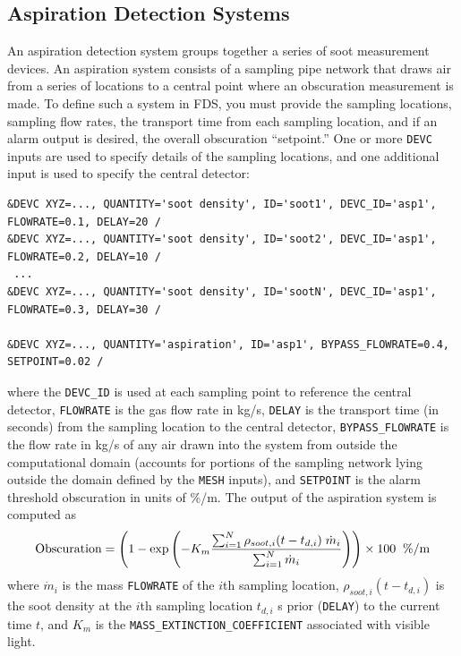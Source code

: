 \documentclass[11pt]{book}
\newcommand{\ct}{\tt\small}
\newcommand{\dm}{\dot{m}}
\newcommand{\be}{\begin{equation}}
\newcommand{\ee}{\end{equation}}
\begin{document}
\subsection{Aspiration Detection Systems}
\label{info:aspiration_detector}

An aspiration detection system groups together a series of soot measurement devices.
An aspiration system consists of a sampling pipe network that draws air from a series of locations to a central point
where an obscuration measurement is made.  To define such a system in FDS, you must provide the sampling locations,
sampling flow rates, the transport time from each sampling location, and if an alarm output is desired, the overall obscuration
``setpoint.''  One or more {\ct DEVC} inputs are used to specify details of the sampling locations, and one additional input is
used to specify the central detector:

\footnotesize
\begin{verbatim}
&DEVC XYZ=..., QUANTITY='soot density', ID='soot1', DEVC_ID='asp1', FLOWRATE=0.1, DELAY=20 /
&DEVC XYZ=..., QUANTITY='soot density', ID='soot2', DEVC_ID='asp1', FLOWRATE=0.2, DELAY=10 /
 ...
&DEVC XYZ=..., QUANTITY='soot density', ID='sootN', DEVC_ID='asp1', FLOWRATE=0.3, DELAY=30 /

&DEVC XYZ=..., QUANTITY='aspiration', ID='asp1', BYPASS_FLOWRATE=0.4, SETPOINT=0.02 /
\end{verbatim}
\normalsize

\noindent
where the {\ct DEVC\_ID} is used at each sampling point to reference the central detector, {\ct FLOWRATE} is the gas
flow rate in kg/s, {\ct DELAY} is the transport time (in seconds) from the sampling location to the central detector,
{\ct BYPASS\_FLOWRATE} is the flow rate in kg/s of any air drawn into the system from outside the computational
domain (accounts for portions of the sampling network lying outside the domain defined by the {\ct MESH}
inputs), and {\ct SETPOINT} is the alarm threshold obscuration in units of \%/m. The output of the aspiration system is
computed as
\be
  \hbox{Obscuration}  = \left(1 - \exp \left( -K_m \frac {\sum_{i=1}^N {\rho_{soot,i}( t-t_{d,i}) \; \dm_i}} {\sum_{i=1}^N{ \dm_i} } \right)  \right) \times 100  \; \; \hbox{\%/m}
\ee
where $\dm_i$ is the mass {\ct FLOWRATE} of the $i$th sampling location, $\rho_{soot,i}( t-t_{d,i})$ is the soot density at
the $i$th sampling location $t_{d,i}$ s prior ({\ct DELAY}) to the current time $t$, and $K_m$ is the {\ct MASS\_EXTINCTION\_COEFFICIENT} associated with visible light.
\end{document}
